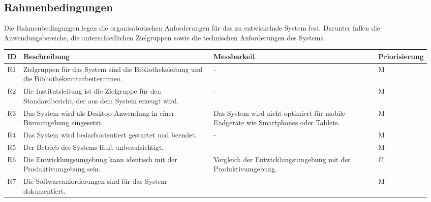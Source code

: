 \subsection{Rahmenbedingungen}
Die Rahmenbedingungen legen die organisatorischen Anforderungen für das zu entwickelnde System fest. 
Darunter fallen die Anwendungsbereiche, die unterschiedlichen Zielgruppen sowie die technischen Anforderungen des Systems. 
\begingroup
\setlength{\tabcolsep}{10pt} %
\renewcommand{\arraystretch}{1.25} 
\begin{table}[h]
    \centering
    \begin{adjustbox}{max width=\textwidth}
    \begin{tabular}{lp{7.5cm}p{7.5cm}l}
       \toprule
       \textbf{ID}          & \textbf{Beschreibung} & \textbf{Messbarkeit} & \textbf{Priorisierung}\\
       \midrule
        R1                                &Zielgruppen für das System sind die Bibliotheksleitung und die Bibliotheksmitarbeiter:innen. & -  & M\\
        R2                                &Die Institutsleitung ist die Zielgruppe für den Standardbericht, der aus dem System erzeugt wird. & -  & M\\
        R3                                &Das System wird als Desktop-Anwendung in einer Büroumgebung eingesetzt. & Das System wird nicht optimiert für mobile Endgeräte wie Smartphones oder Tablets. & M\\
        R4                                &Das System wird bedarfsorientiert gestartet und beendet. & -  & M\\
        R5                                &Der Betrieb des Systems läuft unbeaufsichtigt. & -  & M\\
        R6                                &Die Entwicklungsumgebung kann identisch mit der Produktivumgebung sein. & Vergleich der Entwicklungsumgebung mit der Produktivumgebung.  & C\\
        R7                                &Die Softwareanforderungen sind für das System dokumentiert. & & M\\

\end{tabular}
\end{adjustbox}
\end{table}
